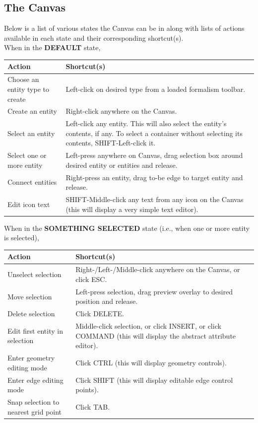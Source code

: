\documentclass{article}
\numberwithin{equation}{section}
\numberwithin{figure}{section}
\begin{document}
\subsection{The Canvas}	
\label{ssec:canvas}
Below is a list of various states the Canvas can be in along with lists of actions available in each state and their corresponding shortcut(s).\\

When in the \textbf{DEFAULT} state,\\

\begin{tabular}{| p{6cm}  p{10cm} |}
	\hline
	\textbf{Action} 				& \textbf{Shortcut(s)} \\ \hline \hline
	Choose an entity type to create	& Left-click on desired type from a loaded formalism toolbar. \\ 
	Create an entity				& Right-click anywhere on the Canvas. \\ 
	Select an entity				& Left-click any entity. This will also select the entity's contents, if any. To select a container without selecting its contents, SHIFT-Left-click it.\\ 
	Select one or more entity		& Left-press anywhere on Canvas, drag selection box around desired entity or entities and release. \\ 
	Connect entities				& Right-press an entity, drag to-be edge to target entity and release. \\ 
	Edit icon text					& SHIFT-Middle-click any text from any icon on the Canvas (this will display a very simple text editor).\\
	\hline
\end{tabular}
\vspace*{2em}


When in the \textbf{SOMETHING SELECTED} state (i.e., when one or more entity is selected),\\

\begin{tabular}{| p{6cm}  p{10cm} |}
	\hline
	\textbf{Action} 				& \textbf{Shortcut(s)} \\ \hline \hline
	Unselect selection				& Right-/Left-/Middle-click anywhere on the Canvas, or click ESC. \\ 
	Move selection					& Left-press selection, drag preview overlay to desired position and release. \\ 
	Delete selection				& Click DELETE. \\ 
	Edit first entity in selection	& Middle-click selection, or click INSERT, or click COMMAND (this will display the abstract attribute editor). \\ 
	Enter geometry editing mode		& Click CTRL (this will display geometry controls). \\
	Enter edge editing mode 		& Click SHIFT (this will display editable edge control points). \\
	Snap selection to nearest grid point	& Click TAB. \\
	\hline
\end{tabular}
\vspace*{2em}
\end{document}
